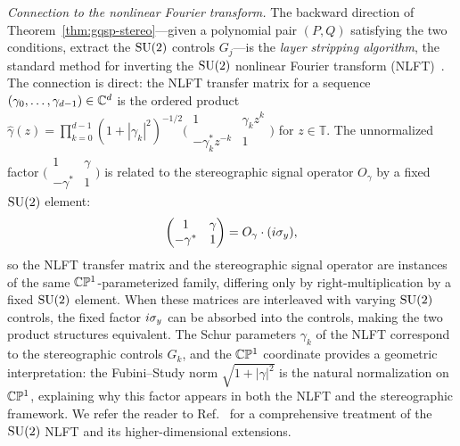 \textit{Connection to the nonlinear Fourier transform.}
The backward direction of
Theorem~\ref{thm:gqsp-stereo}---given a polynomial pair
$(P,Q)$ satisfying the two conditions, extract the $\mathrm{SU}(2)$
controls $G_j$---is the \emph{layer stripping algorithm}, the
standard method for inverting the $\mathrm{SU}(2)$ nonlinear Fourier
transform (NLFT)~\cite{AlexisBeckerEtAl2026}.  The connection
is direct: the NLFT transfer matrix for a sequence
$(\gamma_0, \ldots, \gamma_{d-1}) \in \mathbb{C}^d$ is the ordered
product
$\hat{\gamma}(z) = \prod_{k=0}^{d-1} (1+|\gamma_k|^2)^{-1/2}
\bigl(\begin{smallmatrix} 1 & \gamma_k z^k \\
-\gamma_k^* z^{-k} & 1 \end{smallmatrix}\bigr)$
for $z \in \mathbb{T}$.  The unnormalized factor
$\bigl(\begin{smallmatrix} 1 & \gamma \\
-\gamma^* & 1 \end{smallmatrix}\bigr)$ is related to the
stereographic signal operator $O_\gamma$ by a fixed $\mathrm{SU}(2)$
element:
\begin{equation}
	\begin{pmatrix} 1 & \gamma \\ -\gamma^* & 1
	\end{pmatrix}
	= O_\gamma \cdot (i\sigma_y),
	\label{eq:nlft-identity}
\end{equation}
so the NLFT transfer matrix and the stereographic signal
operator are instances of the same
$\mathbb{C}\mathbb{P}^1$-parameterized family, differing only by
right-multiplication by a fixed $\mathrm{SU}(2)$ element.  When these
matrices are interleaved with varying $\mathrm{SU}(2)$ controls, the
fixed factor $i\sigma_y$ can be absorbed into the controls,
making the two product structures equivalent.  The Schur
parameters $\gamma_k$ of the NLFT correspond to the
stereographic controls $G_k$, and the $\mathbb{C}\mathbb{P}^1$
coordinate provides a geometric interpretation: the
Fubini--Study norm $\sqrt{1+|\gamma|^2}$ is the natural
normalization on $\mathbb{C}\mathbb{P}^1$, explaining why this factor
appears in both the NLFT and the stereographic framework.  We
refer the reader to Ref.~\cite{AlexisBeckerEtAl2026} for a
comprehensive treatment of the $\mathrm{SU}(2)$ NLFT and its
higher-dimensional extensions.
